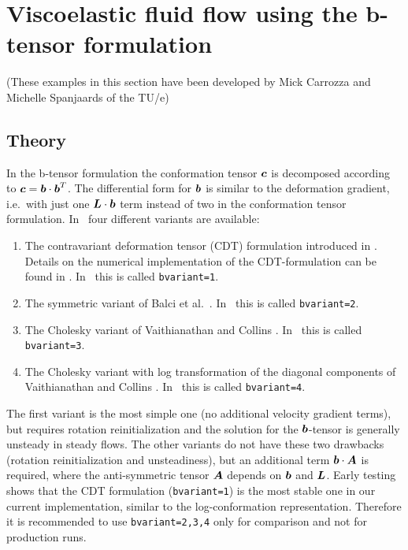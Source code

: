 
\def\headdate{6th December 2023}

\section{Viscoelastic fluid flow using the b-tensor formulation}
\label{sec:CDTformulation}

(These examples in this section have been developed by Mick Carrozza and Michelle Spanjaards of the TU/e)

\subsection{Theory}

In the b-tensor formulation the conformation tensor $\boldsymbol{c}$ is decomposed
according to $\boldsymbol{c}=\boldsymbol{b}\cdot\boldsymbol{b}^T$. The differential form for $\boldsymbol{b}$ is similar to the deformation gradient, i.e.\ with just one $\boldsymbol{L}\cdot\boldsymbol{b}$ term instead of two in the conformation tensor formulation. In \tfem\ four different variants are available:
\begin{enumerate}
\item  The contravariant deformation tensor (CDT)
formulation introduced in \cite{hutter_fluctuating_2018}. Details on the
numerical implementation of the CDT-formulation can be found in \cite{carrozza_viscoelastic_2019}. 
In \tfem\ this is called \texttt{bvariant=1}.
\item The symmetric variant of Balci et al.\ \cite{balci_symmetric_2011}.
In \tfem\ this is called \texttt{bvariant=2}.
\item The Cholesky variant of Vaithianathan and Collins \cite{vaithianathan_numerical_2003}.
In \tfem\ this is called \texttt{bvariant=3}.
\item The Cholesky variant with
log transformation of the diagonal components of Vaithianathan and Collins \cite{vaithianathan_numerical_2003} .
In \tfem\ this is called \texttt{bvariant=4}.
\end{enumerate}
The first variant is the most simple one (no additional velocity gradient terms), but requires rotation reinitialization and the solution for the $\boldsymbol{b}$-tensor is generally unsteady in steady flows.
The other variants do not have these two drawbacks (rotation reinitialization and unsteadiness), but an additional term $\boldsymbol{b}\cdot\boldsymbol{A}$ is required, where the anti-symmetric tensor
$\boldsymbol{A}$ depends on $\boldsymbol{b}$ and $\boldsymbol{L}$. Early testing shows that the CDT formulation (\texttt{bvariant=1}) is the most stable one in our current implementation, similar to the log-conformation representation. Therefore it is recommended to use \texttt{bvariant=2,3,4} only for comparison and not for production runs.

